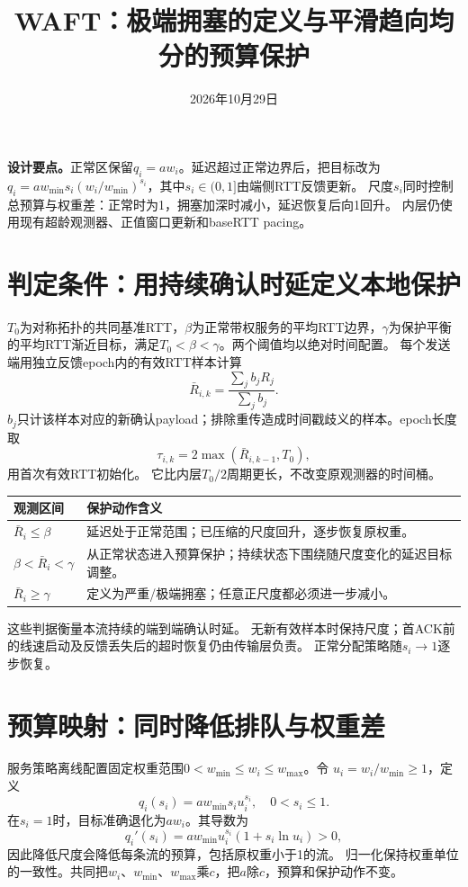 \documentclass[10pt,a4paper]{ctexart}
\title{WAFT：极端拥塞的定义与平滑趋向均分的预算保护}
\author{}\date{2026年10月29日}
\begin{document}
\maketitle

\noindent\textbf{设计要点。}正常区保留$q_i=aw_i$。延迟超过正常边界后，把目标改为
$q_i=a w_{\min}s_i(w_i/w_{\min})^{s_i}$，其中$s_i\in(0,1]$由端侧RTT反馈更新。
尺度$s_i$同时控制总预算与权重差：正常时为1，拥塞加深时减小，延迟恢复后向1回升。
内层仍使用现有超龄观测器、正值窗口更新和baseRTT pacing。

\section{判定条件：用持续确认时延定义本地保护}

$T_0$为对称拓扑的共同基准RTT，$\beta$为正常带权服务的平均RTT边界，$\gamma$为保护平衡的平均RTT渐近目标，满足$T_0<\beta<\gamma$。两个阈值均以绝对时间配置。
每个发送端用独立反馈epoch内的有效RTT样本计算
\[
 \bar R_{i,k}=\frac{\sum_j b_jR_j}{\sum_jb_j}.
\]
$b_j$只计该样本对应的新确认payload；排除重传造成时间戳歧义的样本。epoch长度取
\[
 \tau_{i,k}=2\max(\bar R_{i,k-1},T_0),
\]
用首次有效RTT初始化。
它比内层$T_0/2$周期更长，不改变原观测器的时间桶。

\begin{center}\begin{tabular}{p{39mm}p{98mm}}\toprule
观测区间 & 保护动作含义\\\midrule
$\bar R_i\le\beta$ & 延迟处于正常范围；已压缩的尺度回升，逐步恢复原权重。\\
$\beta<\bar R_i<\gamma$ & 从正常状态进入预算保护；持续状态下围绕随尺度变化的延迟目标调整。\\
$\bar R_i\ge\gamma$ & 定义为严重/极端拥塞；任意正尺度都必须进一步减小。\\\bottomrule
\end{tabular}\end{center}

这些判据衡量本流持续的端到端确认时延。
无新有效样本时保持尺度；首ACK前的线速启动及反馈丢失后的超时恢复仍由传输层负责。
正常分配策略随$s_i\to1$逐步恢复。

\section{预算映射：同时降低排队与权重差}

服务策略离线配置固定权重范围$0<w_{\min}\le w_i\le w_{\max}$。令
$u_i=w_i/w_{\min}\ge1$，定义
\begin{equation}
 q_i(s_i)=a w_{\min}s_i u_i^{s_i},\quad0<s_i\le1.
 \label{eq:zh-budget}
\end{equation}
在$s_i=1$时，目标准确退化为$aw_i$。其导数为
\[
 q_i'(s_i)=a w_{\min}u_i^{s_i}(1+s_i\ln u_i)>0,
\]
因此降低尺度会降低每条流的预算，包括原权重小于1的流。
归一化保持权重单位的一致性。共同把$w_i$、$w_{\min}$、$w_{\max}$乘$c$，把$a$除$c$，预算和保护动作不变。
\end{document}
